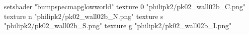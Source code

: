 setshader "bumpspecmapglowworld"
    texture 0 "philipk2/pk02_wall02b_C.png"
    texture n "philipk2/pk02_wall02b_N.png"
    texture s "philipk2/pk02_wall02b_S.png"
    texture g "philipk2/pk02_wall02b_I.png"